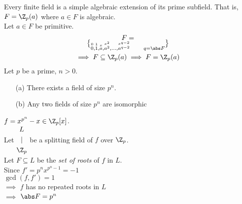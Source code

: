 \prop Every finite field is a simple algebraic extension of its prime subfield.  That is, $F=\Z_p(a)$ where $a\in F$ is algebraic. \\
\pf Let $a\in F$ be primitive.
\begin{gather*}
F = \brace{\overset{0}{0},\overset{1}{1},\overset{x}{a},\overset{x^2}{a^2},\dotsc,\overset{x^{q-2}}{a^{q-2}}} \qquad q=\abs F \\
\implies F \subseteq \Z_p(a) \implies F = \Z_p(a)
\end{gather*}
\thm Let $p$ be a prime, $n>0$.
\begin{enumerate}
\item[(a)] There exists a field of size $p^n$.
\item[(b)] Any two fields of size $p^n$ are isomorphic
\end{enumerate}
\pf $f=x^{p^n}-x\in\Z_p[x]$. \\
Let $\begin{gathered}L\\|\\\Z_p\end{gathered}$ be a splitting field of $f$ over $\Z_p$. \\
Let $F\subseteq L$ be the \emph{set of roots} of $f$ in $L$. \\
Since $f'=p^nx^{p^n-1}=-1$ \\
$\gcd(f,f')=1$ \\
$\implies$ $f$ has no repeated roots in $L$ \\
$\implies$ $\abs F=p^n$

